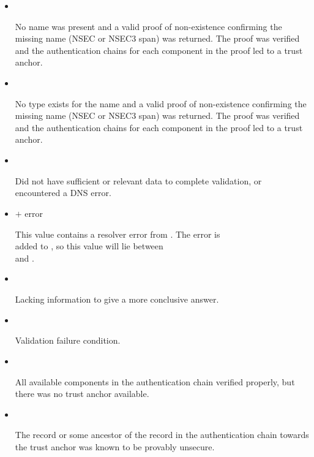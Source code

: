 \begin{description}
\begin{description}
\begin{itemize}
\item {}\verb" "

No name was present and a valid proof of non-existence confirming the missing
name (NSEC or NSEC3 span) was returned.  The proof was verified and the
authentication chains for each component in the proof led to a trust anchor.

\item {}\verb" "

No type exists for the name and a valid proof of non-existence confirming the
missing name (NSEC or NSEC3 span) was returned.  The proof was verified and
the authentication chains for each component in the proof led to a trust
anchor.

\item {}\verb" "

Did not have sufficient or relevant data to complete validation, or
encountered a DNS error.

\item {} $+$ error\verb" "

This value contains a resolver error from .  The 
error is \\
added to , so this value will lie between \\
 and .

\item {}\verb" "

Lacking information to give a more conclusive answer.

\item {}\verb" "

Validation failure condition.

\item {}\verb" "

All available components in the authentication chain verified properly, but
there was no trust anchor available.

\item {}\verb" "

The record or some ancestor of the record in the authentication chain towards
the trust anchor was known to be provably unsecure.

\end{itemize}


\end{description}
\end{description}
